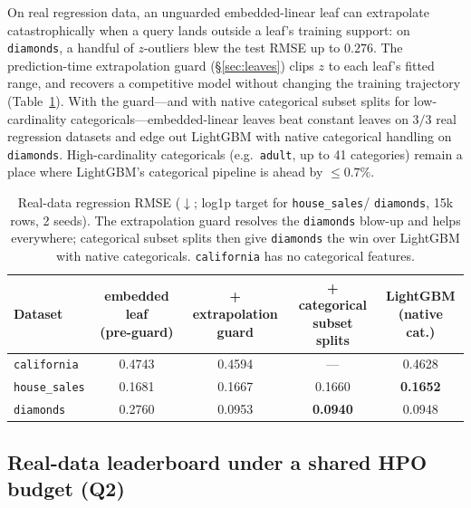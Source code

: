 \documentclass[11pt]{article}
\begin{document}
On real regression data, an unguarded embedded-linear leaf can extrapolate
catastrophically when a query lands outside a leaf's training support: on
\texttt{diamonds}, a handful of $z$-outliers blew the test RMSE up to $0.276$. The
prediction-time extrapolation guard (\S\ref{sec:leaves}) clips $z$ to each leaf's fitted
range, and recovers a competitive model without changing the training trajectory
(Table~\ref{tab:guard}). With the guard---and with native categorical subset splits for
low-cardinality categoricals---embedded-linear leaves beat constant leaves on $3/3$ real
regression datasets and edge out LightGBM with native categorical handling on
\texttt{diamonds}. High-cardinality categoricals (e.g.\ \texttt{adult}, up to 41
categories) remain a place where LightGBM's categorical pipeline is ahead by $\le0.7\%$.

\begin{table}[t]
\centering
\caption{Real-data regression RMSE ($\downarrow$; log1p target for \texttt{house\_sales}/
\texttt{diamonds}, 15k rows, 2 seeds). The extrapolation guard resolves the
\texttt{diamonds} blow-up and helps everywhere; categorical subset splits then give
\texttt{diamonds} the win over LightGBM with native categoricals. \texttt{california} has
no categorical features.}
\label{tab:guard}
\begin{tabular}{lcccc}
\toprule
Dataset & \makecell{embedded leaf\\(pre-guard)} & \makecell{+ extrapolation\\guard} & \makecell{+ categorical\\subset splits} & \makecell{LightGBM\\(native cat.)} \\
\midrule
\texttt{california}  & 0.4743 & 0.4594 & --- & 0.4628 \\
\texttt{house\_sales}& 0.1681 & 0.1667 & 0.1660 & \textbf{0.1652} \\
\texttt{diamonds}    & 0.2760 & 0.0953 & \textbf{0.0940} & 0.0948 \\
\bottomrule
\end{tabular}
\end{table}

\subsection{Real-data leaderboard under a shared HPO budget (Q2)}
\label{sec:exp-openml}
\end{document}
